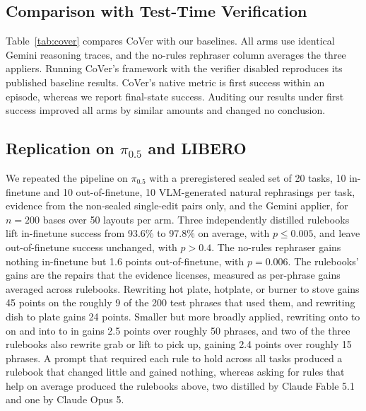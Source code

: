 \documentclass[letterpaper, 10 pt, conference]{ieeeconf} %
\begin{document}
\subsection{Comparison with Test-Time Verification}
\label{sec:cover}

Table~\ref{tab:cover} compares CoVer with our baselines. All arms use identical Gemini reasoning traces, and the no-rules rephraser column averages the three appliers. Running CoVer's framework with the verifier disabled reproduces its published baseline results. CoVer's native metric is first success within an episode, whereas we report final-state success. Auditing our results under first success improved all arms by similar amounts and changed no conclusion.

\begin{table}[!t]
 \caption{\small CoVer against our two baselines on the sealed tasks: pooled success (\%) at step 60, all arms using identical Gemini reasoning traces. CoVer trails both baselines on every set.}
 \label{tab:cover}
 \centering
 \footnotesize
 \setlength{\tabcolsep}{5pt}
 
\end{table}

\subsection{Replication on $\pi_{0.5}$ and LIBERO}
\label{sec:libero-repl}

We repeated the pipeline on $\pi_{0.5}$ with a preregistered sealed set of 20 tasks, 10 in-finetune and 10 out-of-finetune, 10 VLM-generated natural rephrasings per task, evidence from the non-sealed single-edit pairs only, and the Gemini applier, for $n = 200$ bases over 50 layouts per arm. Three independently distilled rulebooks lift in-finetune success from 93.6\% to 97.8\% on average, with $p \le 0.005$, and leave out-of-finetune success unchanged, with $p > 0.4$. The no-rules rephraser gains nothing in-finetune but 1.6 points out-of-finetune, with $p = 0.006$. The rulebooks' gains are the repairs that the evidence licenses, measured as per-phrase gains averaged across rulebooks. Rewriting hot plate, hotplate, or burner to stove gains 45 points on the roughly 9 of the 200 test phrases that used them, and rewriting dish to plate gains 24 points. Smaller but more broadly applied, rewriting onto to on and into to in gains 2.5 points over roughly 50 phrases, and two of the three rulebooks also rewrite grab or lift to pick up, gaining 2.4 points over roughly 15 phrases. A prompt that required each rule to hold across all tasks produced a rulebook that changed little and gained nothing, whereas asking for rules that help on average produced the rulebooks above, two distilled by Claude Fable 5.1 and one by Claude Opus 5.
\end{document}
